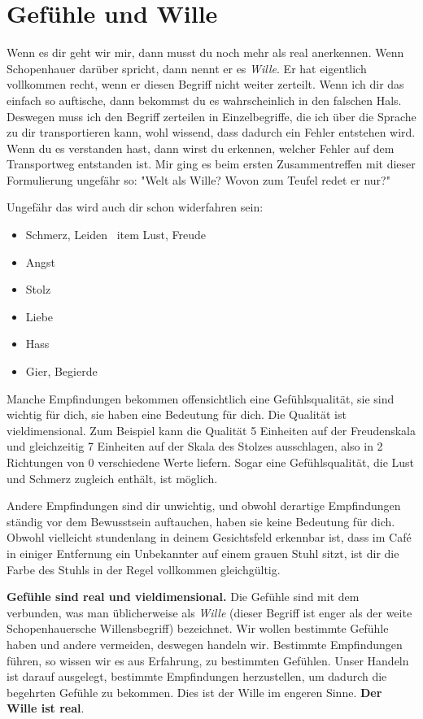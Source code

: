 \documentclass[12pt]{book}
\begin{document}
\section{Gefühle und Wille}

Wenn es dir geht wir mir, dann musst du noch mehr als real anerkennen. Wenn Schopenhauer darüber spricht, dann nennt er es \emph{Wille}. Er hat eigentlich vollkommen recht, wenn er diesen Begriff nicht weiter zerteilt. Wenn ich dir das einfach so auftische, dann bekommst du es wahrscheinlich in den falschen Hals. Deswegen muss ich den Begriff zerteilen in Einzelbegriffe, die ich über die Sprache zu dir transportieren kann, wohl wissend, dass dadurch ein Fehler entstehen wird. Wenn du es verstanden hast, dann wirst du erkennen, welcher Fehler auf dem Transportweg entstanden ist. Mir ging es beim ersten Zusammentreffen mit dieser Formulierung ungefähr so: "Welt als Wille? Wovon zum Teufel redet er nur?"

Ungefähr das wird auch dir schon widerfahren sein:
\begin{itemize}
\item Schmerz, Leiden
\	item Lust, Freude
\item Angst
\item Stolz
\item Liebe
\item Hass
\item Gier, Begierde
\end{itemize}

Manche Empfindungen bekommen offensichtlich eine Gefühlsqualität, sie sind wichtig für dich, sie haben eine Bedeutung für dich. Die Qualität ist vieldimensional. Zum Beispiel kann die Qualität 5 Einheiten auf der Freudenskala und gleichzeitig 7 Einheiten auf der Skala des Stolzes ausschlagen, also in 2 Richtungen von 0 verschiedene Werte liefern. Sogar eine Gefühlsqualität, die Lust und Schmerz zugleich enthält, ist möglich. 

Andere Empfindungen sind dir unwichtig, und obwohl derartige Empfindungen ständig vor dem Bewusstsein auftauchen, haben sie keine Bedeutung für dich. Obwohl vielleicht stundenlang in deinem Gesichtsfeld erkennbar ist, dass im Café in einiger Entfernung ein Unbekannter auf einem grauen Stuhl sitzt, ist dir die Farbe des Stuhls in der Regel vollkommen gleichgültig.

\textbf{Gefühle sind real und vieldimensional.} Die Gefühle sind mit dem verbunden, was man üblicherweise als \emph{Wille} (dieser Begriff ist enger als der weite Schopenhauersche Willensbegriff) bezeichnet. Wir wollen bestimmte Gefühle haben und andere vermeiden, deswegen handeln wir. Bestimmte Empfindungen führen, so wissen wir es aus Erfahrung, zu bestimmten Gefühlen. Unser Handeln ist darauf ausgelegt, bestimmte Empfindungen herzustellen, um dadurch die begehrten Gefühle zu bekommen. Dies ist der Wille im engeren Sinne. \textbf{Der Wille ist real}.
\end{document}
